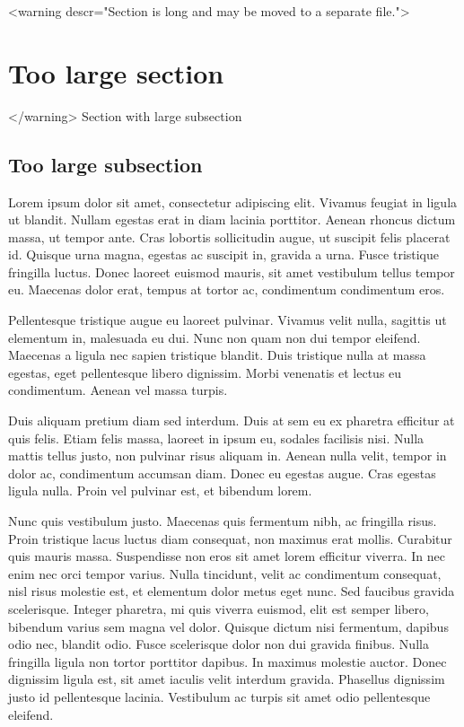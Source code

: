 \documentclass[11pt]{article}
\begin{document}
    <warning descr="Section is long and may be moved to a separate file.">\section{Too large section}</warning>
    Section with large subsection

    \subsection{Too large subsection}
    Lorem ipsum dolor sit amet, consectetur adipiscing elit. Vivamus feugiat in ligula ut blandit. Nullam egestas erat in diam lacinia porttitor. Aenean rhoncus dictum massa, ut tempor ante. Cras lobortis sollicitudin augue, ut suscipit felis placerat id. Quisque urna magna, egestas ac suscipit in, gravida a urna. Fusce tristique fringilla luctus. Donec laoreet euismod mauris, sit amet vestibulum tellus tempor eu. Maecenas dolor erat, tempus at tortor ac, condimentum condimentum eros.

    Pellentesque tristique augue eu laoreet pulvinar. Vivamus velit nulla, sagittis ut elementum in, malesuada eu dui. Nunc non quam non dui tempor eleifend. Maecenas a ligula nec sapien tristique blandit. Duis tristique nulla at massa egestas, eget pellentesque libero dignissim. Morbi venenatis et lectus eu condimentum. Aenean vel massa turpis.

    Duis aliquam pretium diam sed interdum. Duis at sem eu ex pharetra efficitur at quis felis. Etiam felis massa, laoreet in ipsum eu, sodales facilisis nisi. Nulla mattis tellus justo, non pulvinar risus aliquam in. Aenean nulla velit, tempor in dolor ac, condimentum accumsan diam. Donec eu egestas augue. Cras egestas ligula nulla. Proin vel pulvinar est, et bibendum lorem.

    Nunc quis vestibulum justo. Maecenas quis fermentum nibh, ac fringilla risus. Proin tristique lacus luctus diam consequat, non maximus erat mollis. Curabitur quis mauris massa. Suspendisse non eros sit amet lorem efficitur viverra. In nec enim nec orci tempor varius. Nulla tincidunt, velit ac condimentum consequat, nisl risus molestie est, et elementum dolor metus eget nunc. Sed faucibus gravida scelerisque. Integer pharetra, mi quis viverra euismod, elit est semper libero, bibendum varius sem magna vel dolor. Quisque dictum nisi fermentum, dapibus odio nec, blandit odio. Fusce scelerisque dolor non dui gravida finibus. Nulla fringilla ligula non tortor porttitor dapibus. In maximus molestie auctor. Donec dignissim ligula est, sit amet iaculis velit interdum gravida. Phasellus dignissim justo id pellentesque lacinia. Vestibulum ac turpis sit amet odio pellentesque eleifend.
\end{document}
